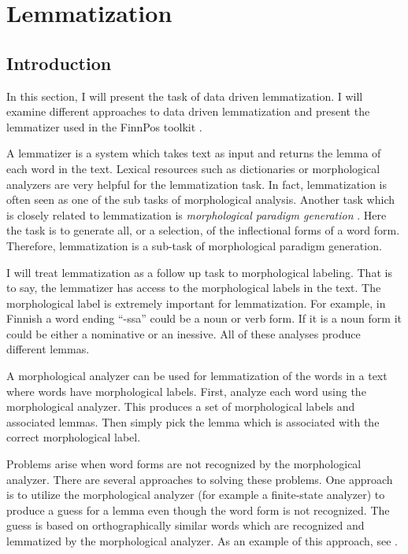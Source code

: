 \chapter{Lemmatization}
\label{chapter:lemmatization}
\section{Introduction}

In this section, I will present the task of data driven
lemmatization. I will examine different approaches to data driven
lemmatization and present the lemmatizer used in the FinnPos toolkit
\cite{Silfverberg2015}.

A lemmatizer is a system which takes text as input and returns the
lemma of each word in the text. Lexical resources such as dictionaries
or morphological analyzers are very helpful for the lemmatization
task. In fact, lemmatization is often seen as one of the sub tasks of
morphological analysis. Another task which is closely related to
lemmatization is {\it morphological paradigm generation}
\citep{Eisnerfoo,Hulden2009}. Here the task is to generate all, or a
selection, of the inflectional forms of a word form. Therefore,
lemmatization is a sub-task of morphological paradigm generation.

I will treat lemmatization as a follow up task to morphological
labeling. That is to say, the lemmatizer has access to the
morphological labels in the text. The morphological label is extremely
important for lemmatization. For example, in Finnish a word ending
``-ssa'' could be a noun or verb form. If it is a noun form it could
be either a nominative or an inessive. All of these analyses produce
different lemmas.

A morphological analyzer can be used for lemmatization of the words in
a text where words have morphological labels. First, analyze each word
using the morphological analyzer. This produces a set of morphological
labels and associated lemmas. Then simply pick the lemma which is
associated with the correct morphological label.

Problems arise when word forms are not recognized by the morphological
analyzer. There are several approaches to solving these problems. One
approach is to utilize the morphological analyzer (for example a
finite-state analyzer) to produce a guess for a lemma even though the
word form is not recognized. The guess is based on orthographically
similar words which are recognized and lemmatized by the morphological
analyzer. As an example of this approach, see \cite{Linden2009}.

